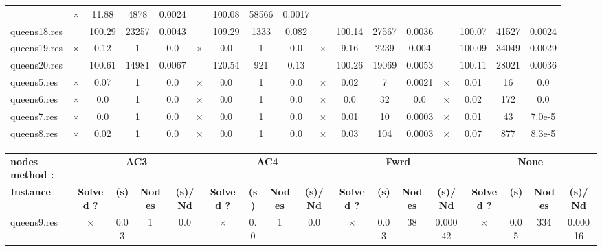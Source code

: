 \documentclass[main.tex]{subfiles}
\begin{document}
\begin{landscape}
\begin{center}
\begin{tabular}{|l|cccc|cccc|cccc|cccc|}
 & $\times$ & 11.88 & 4878 & 0.0024
 &  & 100.08 & 58566 & 0.0017
\\
queens18.res &  & 100.29 & 23257 & 0.0043
 &  & 109.29 & 1333 & 0.082
 &  & 100.14 & 27567 & 0.0036
 &  & 100.07 & 41527 & 0.0024
\\
queens19.res & $\times$ & 0.12 & 1 & 0.0
 & $\times$ & 0.0 & 1 & 0.0
 & $\times$ & 9.16 & 2239 & 0.004
 &  & 100.09 & 34049 & 0.0029
\\
queens20.res &  & 100.61 & 14981 & 0.0067
 &  & 120.54 & 921 & 0.13
 &  & 100.26 & 19069 & 0.0053
 &  & 100.11 & 28021 & 0.0036
\\
queens5.res & $\times$ & 0.07 & 1 & 0.0
 & $\times$ & 0.0 & 1 & 0.0
 & $\times$ & 0.02 & 7 & 0.0021
 & $\times$ & 0.01 & 16 & 0.0
\\
queens6.res & $\times$ & 0.0 & 1 & 0.0
 & $\times$ & 0.0 & 1 & 0.0
 & $\times$ & 0.0 & 32 & 0.0
 & $\times$ & 0.02 & 172 & 0.0
\\
queens7.res & $\times$ & 0.0 & 1 & 0.0
 & $\times$ & 0.0 & 1 & 0.0
 & $\times$ & 0.01 & 10 & 0.0003
 & $\times$ & 0.01 & 43 & 7.0e-5
\\
queens8.res & $\times$ & 0.02 & 1 & 0.0
 & $\times$ & 0.0 & 1 & 0.0
 & $\times$ & 0.03 & 104 & 0.0003
 & $\times$ & 0.07 & 877 & 8.3e-5
\\
\hline\end{tabular}
\end{center}
\end{landscape}
\newpage
\begin{landscape}
\begin{center}
\renewcommand{\arraystretch}{1.4} 
\begin{tabular}{|l|cccc|cccc|cccc|cccc|}
	\hline
\textbf{nodes method :} & \multicolumn{4}{c}{\textbf{AC3}} & \multicolumn{4}{c}{\textbf{AC4}} & \multicolumn{4}{c}{\textbf{Fwrd}} & \multicolumn{4}{c}{\textbf{None}}\\
\textbf{Instance}  & \textbf{Solved ?} & \textbf{(s)} & \textbf{Nodes} & \textbf{(s)/Nd} & \textbf{Solved ?} & \textbf{(s)} & \textbf{Nodes} & \textbf{(s)/Nd} & \textbf{Solved ?} & \textbf{(s)} & \textbf{Nodes} & \textbf{(s)/Nd} & \textbf{Solved ?} & \textbf{(s)} & \textbf{Nodes} & \textbf{(s)/Nd}\\\hline

queens9.res & $\times$ & 0.03 & 1 & 0.0
 & $\times$ & 0.0 & 1 & 0.0
 & $\times$ & 0.03 & 38 & 0.00042
 & $\times$ & 0.05 & 334 & 0.00016
\\
\hline\end{tabular}
\end{center}
\end{landscape}
\end{document}
